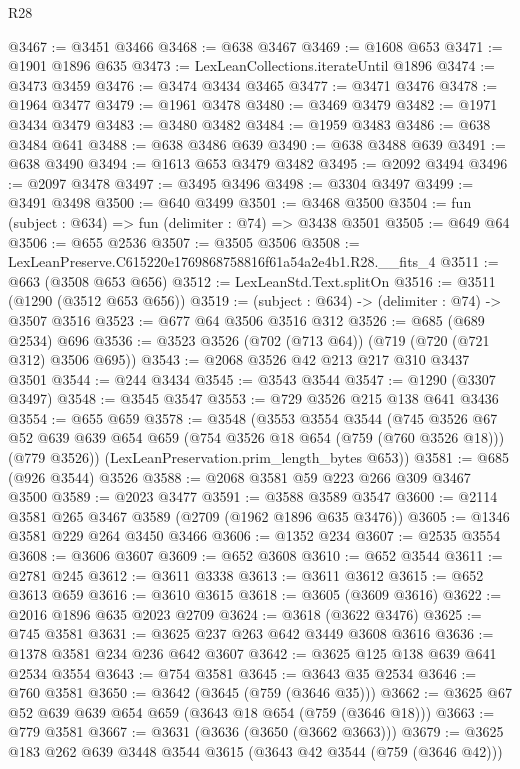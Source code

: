\begin{lexlean}{R28}
\begin{coremodule}
@3467 := @3451 @3466
@3468 := @638 @3467
@3469 := @1608 @653
@3471 := @1901 @1896 @635
@3473 := LexLeanCollections.iterateUntil @1896
@3474 := @3473 @3459
@3476 := @3474 @3434 @3465
@3477 := @3471 @3476
@3478 := @1964 @3477
@3479 := @1961 @3478
@3480 := @3469 @3479
@3482 := @1971 @3434 @3479
@3483 := @3480 @3482
@3484 := @1959 @3483
@3486 := @638 @3484 @641
@3488 := @638 @3486 @639
@3490 := @638 @3488 @639
@3491 := @638 @3490
@3494 := @1613 @653 @3479 @3482
@3495 := @2092 @3494
@3496 := @2097 @3478
@3497 := @3495 @3496
@3498 := @3304 @3497
@3499 := @3491 @3498
@3500 := @640 @3499
@3501 := @3468 @3500
@3504 := fun (subject : @634) => fun (delimiter : @74) => @3438 @3501
@3505 := @649 @64
@3506 := @655 @2536
@3507 := @3505 @3506
@3508 := LexLeanPreserve.C615220e1769868758816f61a54a2e4b1.R28.__fits_4
@3511 := @663 (@3508 @653 @656)
@3512 := LexLeanStd.Text.splitOn
@3516 := @3511 (@1290 (@3512 @653 @656))
@3519 := (subject : @634) -> (delimiter : @74) -> @3507 @3516
@3523 := @677 @64 @3506 @3516 @312
@3526 := @685 (@689 @2534) @696
@3536 := @3523 @3526 (@702 (@713 @64)) (@719 (@720 (@721 @312) @3506 @695))
@3543 := @2068 @3526 @42 @213 @217 @310 @3437 @3501
@3544 := @244 @3434
@3545 := @3543 @3544
@3547 := @1290 (@3307 @3497)
@3548 := @3545 @3547
@3553 := @729 @3526 @215 @138 @641 @3436
@3554 := @655 @659
@3578 := @3548
    (@3553
      @3554
      @3544
      (@745
        @3526
        @67
        @52
        @639
        @639
        @654
        @659
        (@754 @3526 @18 @654 (@759 (@760 @3526 @18)))
        (@779 @3526))
      (LexLeanPreservation.prim_length_bytes @653))
@3581 := @685 (@926 @3544) @3526
@3588 := @2068 @3581 @59 @223 @266 @309 @3467 @3500
@3589 := @2023 @3477
@3591 := @3588 @3589 @3547
@3600 := @2114 @3581 @265 @3467 @3589 (@2709 (@1962 @1896 @635 @3476))
@3605 := @1346 @3581 @229 @264 @3450 @3466
@3606 := @1352 @234
@3607 := @2535 @3554
@3608 := @3606 @3607
@3609 := @652 @3608
@3610 := @652 @3544
@3611 := @2781 @245
@3612 := @3611 @3338
@3613 := @3611 @3612
@3615 := @652 @3613 @659
@3616 := @3610 @3615
@3618 := @3605 (@3609 @3616)
@3622 := @2016 @1896 @635 @2023 @2709
@3624 := @3618 (@3622 @3476)
@3625 := @745 @3581
@3631 := @3625 @237 @263 @642 @3449 @3608 @3616
@3636 := @1378 @3581 @234 @236 @642 @3607
@3642 := @3625 @125 @138 @639 @641 @2534 @3554
@3643 := @754 @3581
@3645 := @3643 @35 @2534
@3646 := @760 @3581
@3650 := @3642 (@3645 (@759 (@3646 @35)))
@3662 := @3625 @67 @52 @639 @639 @654 @659 (@3643 @18 @654 (@759 (@3646 @18)))
@3663 := @779 @3581
@3667 := @3631 (@3636 (@3650 (@3662 @3663)))
@3679 := @3625 @183 @262 @639 @3448 @3544 @3615 (@3643 @42 @3544 (@759 (@3646 @42)))

\end{coremodule}
\end{lexlean}
